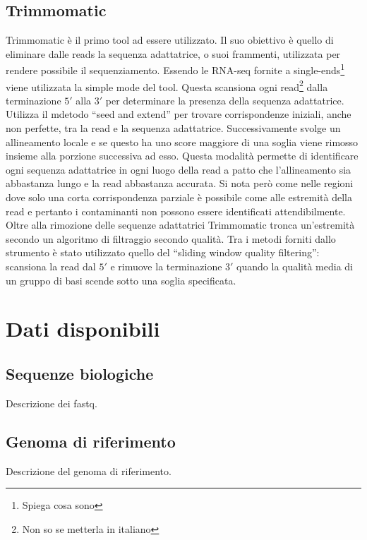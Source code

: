   	\subsection{Trimmomatic}
	Trimmomatic \cite{trimmomatic} \`e il primo tool ad essere utilizzato.
	Il suo obiettivo \`e quello di eliminare dalle reads la sequenza adattatrice, o suoi frammenti, utilizzata per rendere possibile il sequenziamento.
	Essendo le RNA-seq fornite a single-ends\footnote{Spiega cosa sono} viene utilizzata la simple mode del tool.
	Questa scansiona ogni read\footnote{Non so se metterla in italiano} dalla terminazione $5'$ alla $3'$ per determinare la presenza della sequenza adattatrice.
	Utilizza il mdetodo ``seed and extend'' per trovare corrispondenze iniziali, anche non perfette, tra la read e la sequenza adattatrice.
	Successivamente svolge un allineamento locale e se questo ha uno score maggiore di una soglia viene rimosso insieme alla porzione successiva ad esso.
	Questa modalit\`a permette di identificare ogni sequenza adattatrice in ogni luogo della read a patto che l'allineamento sia abbastanza lungo e la read abbastanza accurata.
	Si nota per\`o come nelle regioni dove solo una corta corrispondenza parziale \`e possibile come alle estremit\`a della read e pertanto i contaminanti non possono essere identificati attendibilmente.
	Oltre alla rimozione delle sequenze adattatrici Trimmomatic tronca un'estremit\`a secondo un algoritmo di filtraggio secondo qualit\`a.
	Tra i metodi forniti dallo strumento \`e stato utilizzato quello del ``sliding window quality filtering'':
	scansiona la read dal $5'$ e rimuove la terminazione $3'$ quando la qualit\`a media di un gruppo di basi scende sotto una soglia specificata.



  \section{Dati disponibili}
  \label{sec:dati}

    \subsection{Sequenze biologiche}
    \label{subsec:fastq}

    Descrizione dei fastq.

    \subsection{Genoma di riferimento}
    \label{subsec:star-gen}
    Descrizione del genoma di riferimento.

